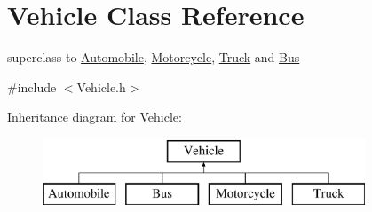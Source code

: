 \hypertarget{class_vehicle}{}\section{Vehicle Class Reference}
\label{class_vehicle}


superclass to \hyperlink{class_automobile}{Automobile}, \hyperlink{class_motorcycle}{Motorcycle}, \hyperlink{class_truck}{Truck} and \hyperlink{class_bus}{Bus}  




{\ttfamily \#include $<$Vehicle.\+h$>$}

Inheritance diagram for Vehicle\+:\begin{figure}[H]
\begin{center}
\leavevmode
\includegraphics[height=2.000000cm]{class_vehicle}
\end{center}
\end{figure}
